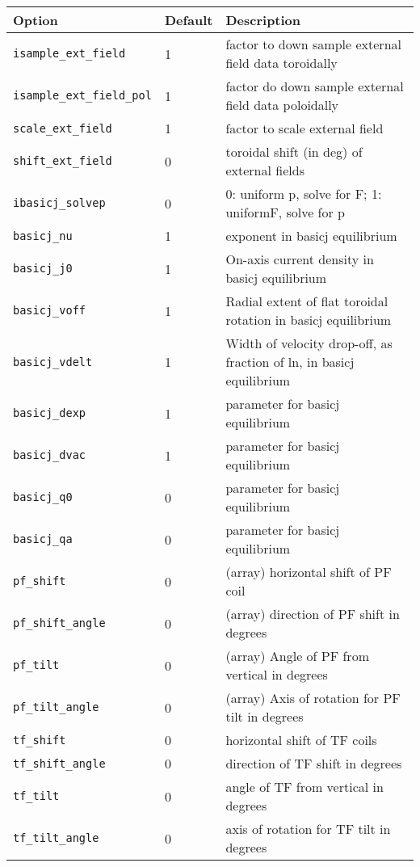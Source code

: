 \begin{tabular}{llp{3in}}
  \textbf{Option}&\textbf{Default}&\textbf{Description}\\
  \hline

 \texttt{isample\_ext\_field} & 1 & factor to down sample external field data toroidally \\
 \texttt{isample\_ext\_field\_pol} & 1 & factor do down sample external field data poloidally \\
 \texttt{scale\_ext\_field} & 1 & factor to scale external field \\
 \texttt{shift\_ext\_field} & 0 & toroidal shift (in deg) of external fields \\
 \texttt{ibasicj\_solvep} & 0 & 0: uniform p, solve for F; 1: uniformF, solve for p \\
 \texttt{basicj\_nu} &1 & exponent in basicj equilibrium \\
 \texttt{basicj\_j0} & 1 & On-axis current density in basicj equilibrium \\
 \texttt{basicj\_voff} & 1 & Radial extent of flat toroidal rotation in basicj equilibrium \\
 \texttt{basicj\_vdelt} & 1 & Width of velocity drop-off, as fraction of ln, in basicj equilibrium \\
 \texttt{basicj\_dexp} & 1 & parameter for basicj equilibrium \\
 \texttt{basicj\_dvac} & 1 & parameter for basicj equilibrium \\
 \texttt{basicj\_q0} & 0 &   parameter for basicj equilibrium \\
 \texttt{basicj\_qa}  & 0 &   parameter for basicj equilibrium \\
 \texttt{pf\_shift} & 0 & (array) horizontal shift of PF coil \\
 \texttt{pf\_shift\_angle} & 0 & (array) direction of PF shift in degrees \\
 \texttt{pf\_tilt} & 0 & (array) Angle of PF from vertical in degrees \\
 \texttt{pf\_tilt\_angle} & 0 & (array) Axis of rotation for PF tilt in degrees \\
 \texttt{tf\_shift} & 0 & horizontal shift of TF coils \\
 \texttt{tf\_shift\_angle} & 0 & direction of TF shift in degrees \\
 \texttt{tf\_tilt} & 0 & angle of TF from vertical in degrees \\
 \texttt{tf\_tilt\_angle} & 0 & axis of rotation for TF tilt in degrees 

\end{tabular}

